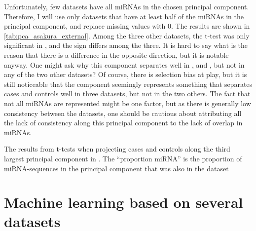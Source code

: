 {{{{{Unfortunately, few datasets have all miRNAs in the chosen principal component. Therefore, I will use only datasets that have at least half of the miRNAs in the principal component, and replace missing values with 0. The results are shown in \autoref{tab:pca_asakura_external}. Among the three other datasets, the t-test was only significant in \citet{Duan2021}, and the sign differs among the three. It is hard to say what is the reason that there is a difference in the opposite direction, but it is notable anyway. One might ask why this component separates well in \citet{Asakura2020}, \citet{Fehlmann2020} and \citet{Duan2021}, but not in any of the two other datasets? Of course, there is selection bias at play, but it is still noticeable that the component seemingly represents something that separates cases and controls well in three datasets, but not in the two others. The fact that not all miRNAs are represented might be one factor, but as there is generally low consistency between the datasets, one should be cautious about attributing all the lack of consistency along this principal component to the lack of overlap in miRNAs.



\begin{table}
    \caption{The results from t-tests when projecting cases and controls along the third largest principal component in \citet{Asakura2020}. The ``proportion miRNA'' is the proportion of miRNA-sequences in the principal component that was also in the dataset}
    \label{tab:pca_asakura_external}
    \begin{center}
    \end{center}
\end{table}


\section{Machine learning based on several datasets}
\label{sec:res_machine_learning_multiple}

}}}}}
